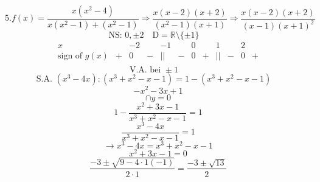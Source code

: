 \documentclass{article}
\begin{document}
\[
5. f(x) = \frac{x(x^2 - 4)}{x(x^2 - 1) + (x^2 - 1)} \Rightarrow \frac{x(x-2)(x+2)}{(x^2-1)(x+1)} \Rightarrow \frac{x(x-2)(x+2)}{(x-1)(x+1)^2}
\]
\[
\text{NS: } 0, \pm 2 \quad \text{D} = \mathbb{R} \setminus \{\pm 1\} \quad 
\]
\[
\begin{array}{c|ccccccc}
x & & -2 & & -1 & & 0 & & 1 & & 2 & \\
\hline
\text{sign of } g(x) & + & 0 & - & || & - & 0 & + & || & - & 0 & + \\
\end{array}
\]
\[
\text{V.A. bei } \pm 1 \quad 
\]
\[
\text{S.A. } (x^3 - 4x) : (x^3 + x^2 - x - 1) = 1 - (x^3 + x^2 - x - 1) \quad 
\]
\[
-x^2 - 3x + 1
\]
\[
\cap y = 0
\]
\[
1 - \frac{x^2 + 3x - 1}{x^3 + x^2 - x - 1} = 1
\]
\[
\frac{x^3-4x}{x^3+x^2-x-1}=1
\]
\[
\rightarrow x^3 - 4x = x^3 + x^2 - x - 1
\]
\[
x^2 + 3x - 1 = 0
\]
\[
\frac{-3 \pm \sqrt{9 - 4\cdot1(-1)}}{2 \cdot 1} = \frac{-3 \pm \sqrt{13}}{2}
\]
\end{document}
